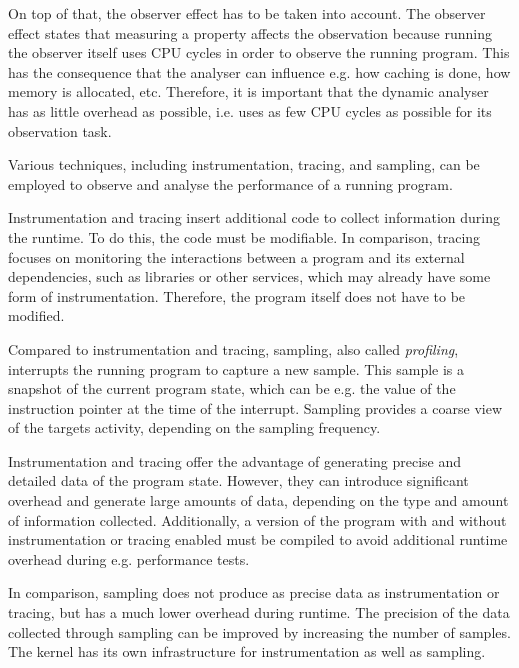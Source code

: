 \newpage

On top of that, the observer effect has to be taken into account. The observer effect states that measuring a property affects the observation because running the observer itself uses CPU cycles in order to observe the running program. This has the consequence that the analyser can influence e.g. how caching is done, how memory is allocated, etc. \cite[p. 20]{patmc} \cite[p. 387]{masterembedded} Therefore, it is important that the dynamic analyser has as little overhead as possible, i.e. uses as few CPU cycles as possible for its observation task. 

Various techniques, including instrumentation, tracing, and sampling, can be employed to observe and analyse the performance of a running program. \cite[p. 52]{patmc}

Instrumentation and tracing insert additional code to collect information during the runtime. To do this, the code must be modifiable. In comparison, tracing focuses on monitoring the interactions between a program and its external dependencies, such as libraries or other services, which may already have some form of instrumentation. Therefore, the program itself does not have to be modified. \cite[p. 52-55]{patmc}

Compared to instrumentation and tracing, sampling, also called \textit{profiling}, interrupts the running program to capture a new sample. This sample is a snapshot of the current program state, which can be e.g. the value of the instruction pointer at the time of the interrupt. Sampling provides a coarse view of the targets activity, depending on the sampling frequency. \cite[p. 35]{brendan} \cite[p. 59]{patmc}

Instrumentation and tracing offer the advantage of generating precise and detailed data of the program state. However, they can introduce significant overhead and generate large amounts of data, depending on the type and amount of information collected. Additionally, a version of the program with and without instrumentation or tracing enabled must be compiled to avoid additional runtime overhead during e.g. performance tests. \cite[p. 53-54]{patmc} \cite{bolt}

In comparison, sampling does not produce as precise data as instrumentation or tracing, but has a much lower overhead during runtime. The precision of the data collected through sampling can be improved by increasing the number of samples. \cite{hfsort} \cite{bolt} The kernel has its own infrastructure for instrumentation as well as sampling.

